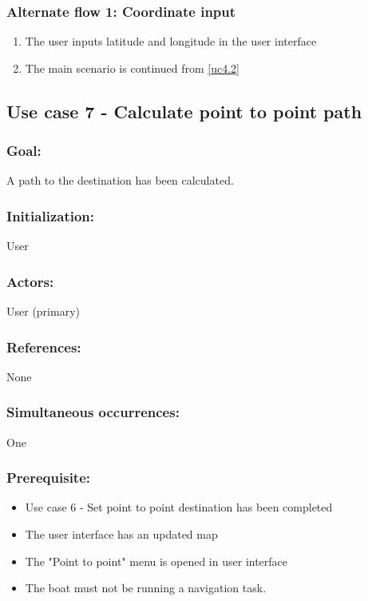 \begin{framed}
	\subsubsection*{Alternate flow 1: Coordinate input} 
	\begin{enumerate}
		\item The user inputs latitude and longitude in the user interface
		\item The main scenario is continued from \ref{uc4.2}
	\end{enumerate}
\end{framed}	

\begin{framed}
	\subsection{Use case 7 - Calculate point to point path}
	\subsubsection*{Goal:}
	A path to the destination has been calculated.
	
	\subsubsection*{Initialization:}
	User
	
	\subsubsection*{Actors:}
	User (primary)
	
	\subsubsection*{References:}
	None
	
	\subsubsection*{Simultaneous occurrences:}
	One 
	
	\subsubsection*{Prerequisite:}
	\begin{itemize}
		\item Use case 6 - Set point to point destination has been completed
		\item The user interface has an updated map
		\item The "Point to point" menu is opened in user interface
		\item The boat must not be running a navigation task.
	\end{itemize}
	

\end{framed}
